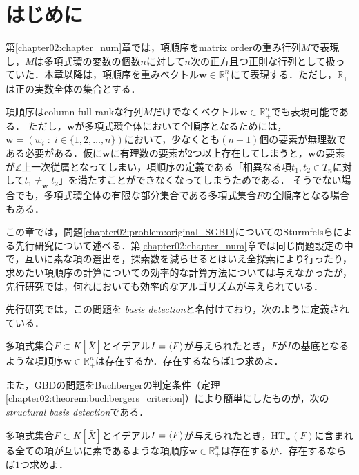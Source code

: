 \section{はじめに}
第\ref{chapter02:chapter_num}章では，項順序をmatrix orderの重み行列$M$で表現し，$M$は多項式環の変数の個数$n$に対して$n$次の正方且つ正則な行列として扱っていた．本章以降は，項順序を重みベクトル$\bm{w}\in \mathbb{R}^n_{+}$にて表現する．ただし，$\mathbb{R}_{+}$は正の実数全体の集合とする．
\begin{remark*}[ベクトルで表現された項順序について]
	項順序はcolumn full rankな行列$M$だけでなくベクトル$\bm{w}\in \mathbb{R}^n_{+}$でも表現可能である．
	ただし，$\bm{w}$が多項式環全体において全順序となるためには，$\bm{w} = (w_i\;:\; i\in \{1, 2, \dots, n\})$において，少なくとも$(n-1)$個の要素が無理数である必要がある．仮に$\bm{w}$に有理数の要素が$2$つ以上存在してしまうと，$\bm{w}$の要素が$\mathbb{Z}$上一次従属となってしまい，項順序の定義である「相異なる項$t_1, t_2 \in T_n$に対して$t_1 \ne_{\bm{w}} t_2$」を満たすことができなくなってしまうためである．
	そうでない場合でも，多項式環全体の有限な部分集合である多項式集合$F$の全順序となる場合もある．
\end{remark*}
\par
この章では，問題\ref{chapter02:problem:original_SGBD}についてのSturmfelsらによる先行研究について述べる．第\ref{chapter02:chapter_num}章では同じ問題設定の中で，互いに素な項の選出を，探索数を減らせるとはいえ全探索により行ったり，求めたい項順序の計算についての効率的な計算方法については与えなかったが，先行研究では，何れにおいても効率的なアルゴリズムが与えられている．
\par
先行研究では，この問題を\emph{\groebner{} basis detection}と名付けており，次のように定義されている．
\begin{problem}
	多項式集合$F \subset K[\bar{X}]$とイデアル$I = \langle F \rangle$が与えられたとき，$F$が$I$の\groebner{}基底となるような項順序$\bm{w} \in \mathbb{R}^n_{+}$は存在するか．存在するならば$1$つ求めよ．
\end{problem}
また，GBDの問題をBuchbergerの判定条件（定理\ref{chapter02:theorem:buchbergers_criterion}）により簡単にしたものが，次の\emph{structural \groebner{} basis detection}である．
\begin{problem}
	\label{chapter03:problem:SGBD}
	多項式集合$F \subset K[\bar{X}]$とイデアル$I = \langle F \rangle$が与えられたとき，$\mathrm{HT}_{\bm{w}}(F)$に含まれる全ての項が互いに素であるような項順序$\bm{w} \in \mathbb{R}^n_{+}$は存在するか．存在するならば$1$つ求めよ．
\end{problem}











